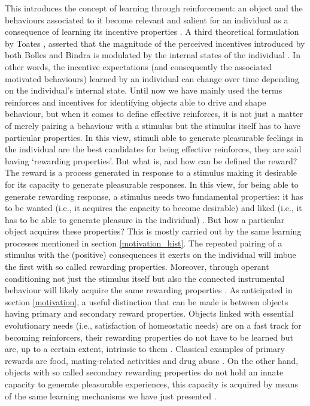 This introduces the concept of learning through reinforcement: an object and the behaviours associated to it become relevant and salient for an individual as a consequence of learning its incentive properties \cite{berridge2004motivation}. A third theoretical formulation by Toates \cite{toates1994comparing}, asserted that the magnitude of the perceived incentives introduced by both Bolles and Bindra is modulated by the internal states of the individual \cite{toates1994comparing,berridge2004motivation}. In other words, the incentive expectations (and consequently the associated motivated behaviours) learned by an individual can change over time depending on the individual's internal state. Until now we have mainly used the terms reinforces and incentives for identifying objects able to drive and shape behaviour, but when it comes to define effective reinforces, it is not just a matter of merely pairing a behaviour with a stimulus but the stimulus itself has to have particular properties. In this view, stimuli able to generate pleasurable feelings in the individual are the best candidates for being effective reinforces, they are said having ‘rewarding properties’. But what is, and how can be defined the reward? The reward is a process generated in response to a stimulus making it desirable for its capacity to generate pleasurable responses. In this view, for being able to generate rewarding response, a stimulus needs two fundamental properties: it has to be wanted (i.e., it acquires the capacity to become desirable) and liked (i.e., it has to be able to generate pleasure in the individual) \cite{berridge2009dissecting}. But how a particular object acquires these properties? This is mostly carried out by the same learning processes mentioned in section \ref{motivation_hist}. The repeated pairing of a stimulus with the (positive) consequences it exerts on the individual will imbue the first with so called rewarding properties. Moreover, through operant conditioning not just the stimulus itself but also the connected instrumental behaviour will likely acquire the same rewarding properties \cite{berridge2009dissecting}. As anticipated in section \ref{motivation}, a useful distinction that can be made is between objects having primary and secondary reward properties. Objects linked with essential evolutionary needs (i.e., satisfaction of homeostatic needs) are on a fast track for becoming reinforcers, their rewarding properties do not have to be learned but are, up to a certain extent, intrinsic to them \cite{sescousse2013processing}. Classical examples of primary rewards are food, mating-related activities and drug abuse \cite{berridge2004motivation, simpson2016behavioral}. On the other hand, objects with so called secondary rewarding properties do not hold an innate capacity to generate pleasurable experiences, this capacity is acquired by means of the same learning mechanisms we have just presented \cite{sescousse2013processing}. 


